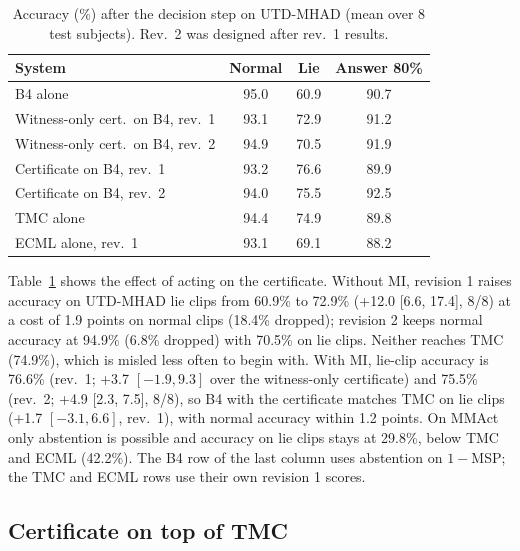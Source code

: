 \documentclass[conference]{IEEEtran}
\begin{document}
\begin{table}[t]
\centering
\caption{Accuracy (\%) after the decision step on UTD-MHAD (mean over 8 test subjects). Rev.\ 2 was designed after rev.\ 1 results.}
\label{tab:policy}
\setlength{\tabcolsep}{4pt}
\begin{tabular}{lccc}
\toprule
System & Normal & Lie & Answer 80\% \\
\midrule
B4 alone & 95.0 & 60.9 & 90.7 \\
Witness-only cert.\ on B4, rev.\ 1 & 93.1 & 72.9 & 91.2 \\
Witness-only cert.\ on B4, rev.\ 2 & 94.9 & 70.5 & 91.9 \\
Certificate on B4, rev.\ 1 & 93.2 & 76.6 & 89.9 \\
Certificate on B4, rev.\ 2 & 94.0 & 75.5 & 92.5 \\
TMC alone & 94.4 & 74.9 & 89.8 \\
ECML alone, rev.\ 1 & 93.1 & 69.1 & 88.2 \\
\bottomrule
\end{tabular}
\end{table}

Table~\ref{tab:policy} shows the effect of acting on the certificate. Without MI, revision 1 raises accuracy on UTD-MHAD lie clips from 60.9\% to 72.9\% (+12.0 [6.6, 17.4], 8/8) at a cost of 1.9 points on normal clips (18.4\% dropped); revision 2 keeps normal accuracy at 94.9\% (6.8\% dropped) with 70.5\% on lie clips. Neither reaches TMC (74.9\%), which is misled less often to begin with. With MI, lie-clip accuracy is 76.6\% (rev.\ 1; +3.7 $[-1.9, 9.3]$ over the witness-only certificate) and 75.5\% (rev.\ 2; +4.9 [2.3, 7.5], 8/8), so B4 with the certificate matches TMC on lie clips (+1.7 $[-3.1, 6.6]$, rev.\ 1), with normal accuracy within 1.2 points. On MMAct only abstention is possible and accuracy on lie clips stays at 29.8\%, below TMC and ECML (42.2\%). The B4 row of the last column uses abstention on $1-$MSP; the TMC and ECML rows use their own revision 1 scores.

\subsection{Certificate on top of TMC}
\end{document}
